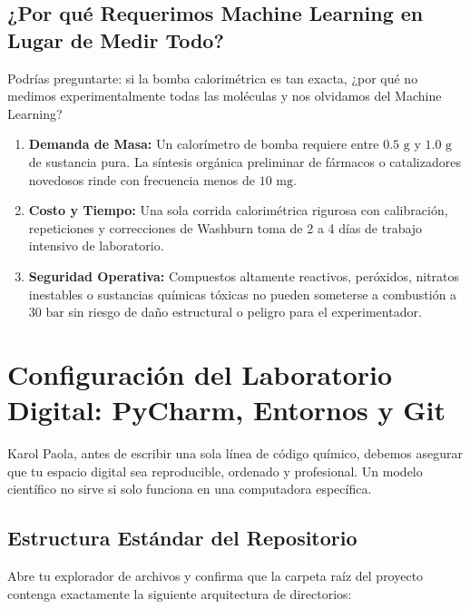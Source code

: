\documentclass[11pt,letterpaper]{report}
\begin{document}
\section{¿Por qué Requerimos Machine Learning en Lugar de Medir Todo?}
Podrías preguntarte: si la bomba calorimétrica es tan exacta, ¿por qué no medimos experimentalmente todas las moléculas y nos olvidamos del Machine Learning?
\begin{enumerate}[leftmargin=*]
    \item \textbf{Demanda de Masa:} Un calorímetro de bomba requiere entre $0.5\text{ g}$ y $1.0\text{ g}$ de sustancia pura. La síntesis orgánica preliminar de fármacos o catalizadores novedosos rinde con frecuencia menos de $10\text{ mg}$.
    \item \textbf{Costo y Tiempo:} Una sola corrida calorimétrica rigurosa con calibración, repeticiones y correcciones de Washburn toma de 2 a 4 días de trabajo intensivo de laboratorio.
    \item \textbf{Seguridad Operativa:} Compuestos altamente reactivos, peróxidos, nitratos inestables o sustancias químicas tóxicas no pueden someterse a combustión a $30\text{ bar}$ sin riesgo de daño estructural o peligro para el experimentador.
\end{enumerate}

\newpage

\chapter{Configuración del Laboratorio Digital: PyCharm, Entornos y Git}

Karol Paola, antes de escribir una sola línea de código químico, debemos asegurar que tu espacio digital sea reproducible, ordenado y profesional. Un modelo científico no sirve si solo funciona en una computadora específica.

\section{Estructura Estándar del Repositorio}
Abre tu explorador de archivos y confirma que la carpeta raíz del proyecto contenga exactamente la siguiente arquitectura de directorios:
\end{document}
